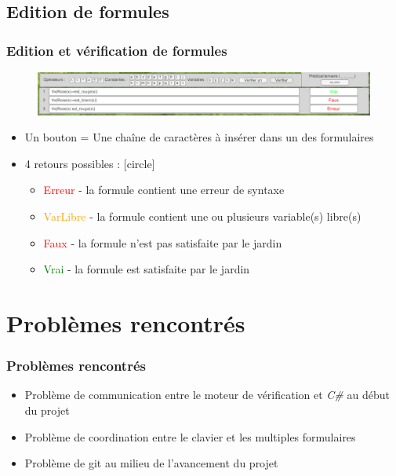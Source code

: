 \documentclass{beamer}
\begin{document}
\subsection{Edition de formules}
\begin{frame}
\frametitle{Edition et vérification de formules}
\begin{center}
\begin{figure}[!h]
\includegraphics[scale=0.42]{clavier.png}
\end{figure}
\end{center}
\begin{itemize}
\setlength\itemsep{0.2cm}
\item Un bouton = Une chaîne de caractères à insérer dans un des formulaires
\item {
4 retours possibles :
[circle]
\begin{itemize}
\item \textcolor{red}{Erreur} - la formule contient une erreur de syntaxe
\item \textcolor{orange}{VarLibre} - la formule contient une ou plusieurs variable(s) libre(s)
\item \textcolor{red}{Faux} - la formule n'est pas satisfaite par le jardin
\item \textcolor{green}{Vrai} - la formule est satisfaite par le jardin
\end{itemize}
}
\end{itemize}
\end{frame}


\section{Problèmes rencontrés}
\begin{frame}
\frametitle{Problèmes rencontrés}
\begin{itemize}
\setlength\itemsep{0.5cm}
\item Problème de communication entre le moteur de vérification et \textit{C\#} au début du projet
\item Problème de coordination entre le clavier et les multiples formulaires
\item Problème de git au milieu de l'avancement du projet
\end{itemize}
\end{frame}
\end{document}
